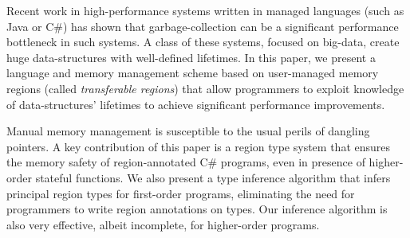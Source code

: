 Recent work in high-performance systems written in managed languages (such as Java or C\#) has shown
that garbage-collection can be a significant performance bottleneck in such systems.
A class of these systems, focused on big-data, create huge data-structures with well-defined lifetimes.
In this paper, we present a language and memory management scheme based on user-managed
memory regions (called \emph{transferable regions}) that allow programmers to exploit
knowledge of data-structures' lifetimes to achieve significant performance improvements.

Manual memory management is susceptible to the usual perils of dangling pointers.
A key contribution of this paper is a region type system that
ensures the memory safety of region-annotated C\# programs,
even in presence of higher-order stateful functions. We
also present a type inference algorithm that infers principal region types
for first-order programs, eliminating the need for programmers to write
region annotations on types. Our inference algorithm is also very
effective, albeit incomplete, for higher-order programs.

